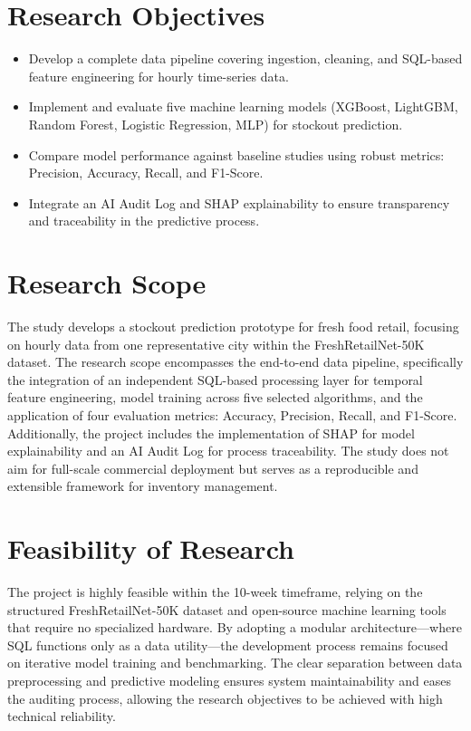 \documentclass[11pt]{article}
\begin{document}
\section{Research Objectives}

\begin{itemize}
  \item Develop a complete data pipeline covering ingestion, cleaning, and SQL-based feature engineering for hourly time-series data.
  \item Implement and evaluate five machine learning models (XGBoost, LightGBM, Random Forest, Logistic Regression, MLP) for stockout prediction.
  \item Compare model performance against baseline studies using robust metrics: Precision, Accuracy, Recall, and F1-Score.
  \item Integrate an AI Audit Log and SHAP explainability to ensure transparency and traceability in the predictive process.
\end{itemize}

\section{Research Scope}

The study develops a stockout prediction prototype for fresh food retail, focusing on hourly data from one representative city within the FreshRetailNet-50K dataset. The research scope encompasses the end-to-end data pipeline, specifically the integration of an independent SQL-based processing layer for temporal feature engineering, model training across five selected algorithms, and the application of four evaluation metrics: Accuracy, Precision, Recall, and F1-Score. Additionally, the project includes the implementation of SHAP for model explainability and an AI Audit Log for process traceability. The study does not aim for full-scale commercial deployment but serves as a reproducible and extensible framework for inventory management.

\section{Feasibility of Research}

The project is highly feasible within the 10-week timeframe, relying on the structured FreshRetailNet-50K dataset and open-source machine learning tools that require no specialized hardware. By adopting a modular architecture---where SQL functions only as a data utility---the development process remains focused on iterative model training and benchmarking. The clear separation between data preprocessing and predictive modeling ensures system maintainability and eases the auditing process, allowing the research objectives to be achieved with high technical reliability.
\end{document}
